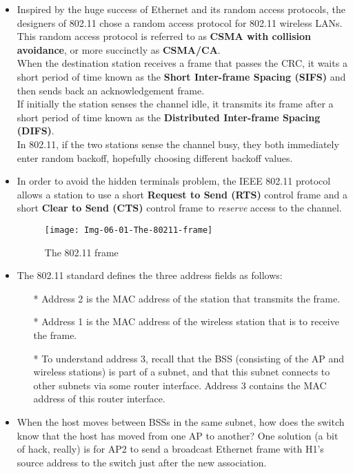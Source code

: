 \begin{itemize}
\item
Inspired by the huge success of Ethernet and its random access protocols, the designers of 802.11 chose a random access protocol for 802.11 wireless LANs. This random access protocol is referred to as \textbf{CSMA with collision avoidance}, or more succinctly as \textbf{CSMA/CA}.\\
When the destination station receives a frame that passes the CRC, it waits a short period of time known as the \textbf{Short Inter-frame Spacing (SIFS)} and then sends back an acknowledgement frame.\\
If initially the station senses the channel idle, it transmits its frame after a short period of time known as the \textbf{Distributed Inter-frame Spacing (DIFS)}.\\
In 802.11, if the two stations sense the channel busy, they both immediately enter random backoff, hopefully choosing different backoff values.

\item
In order to avoid the hidden terminals problem, the IEEE 802.11 protocol allows a station to use a short \textbf{Request to Send (RTS)} control frame and a short \textbf{Clear to Send (CTS)} control frame to \textit{reserve} access to the channel.

\begin{figure}[h]
\texttt{[image: Img-06-01-The-80211-frame]}
\centering
\caption{The 802.11 frame}
\label{fig:fig-06-01}
\end{figure}

\item
The 802.11 standard defines the three address fields as follows:
\begin{itemize}
\item[*]Address 2 is the MAC address of the station that transmits the frame.
\item[*]Address 1 is the MAC address of the wireless station that is to receive the frame.
\item[*]To understand address 3, recall that the BSS (consisting of the AP and wireless stations) is part of a subnet, and that this subnet connects to other subnets via some router interface. Address 3 contains the MAC address of this router interface.
\end{itemize}

\item
When the host moves between BSSs in the same subnet, how does the switch know that the host has moved from one AP to another? One solution (a bit of hack, really) is for AP2 to send a broadcast Ethernet frame with H1's source address to the switch just after the new association.


\end{itemize}
